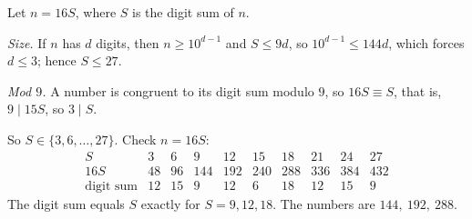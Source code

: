 Let $n=16S$, where $S$ is the digit sum of $n$.

\emph{Size.} If $n$ has $d$ digits, then $n\ge10^{d-1}$ and $S\le9d$, so $10^{d-1}\le144d$, which forces $d\le3$; hence $S\le27$.

\emph{Mod $9$.} A number is congruent to its digit sum modulo $9$, so $16S\equiv S$, that is, $9\mid15S$, so $3\mid S$.

So $S\in\{3,6,\dots,27\}$. Check $n=16S$:
\[
\begin{array}{c|ccccccccc}
S&3&6&9&12&15&18&21&24&27\\ \hline
16S&48&96&144&192&240&288&336&384&432\\
\text{digit sum}&12&15&9&12&6&18&12&15&9
\end{array}
\]
The digit sum equals $S$ exactly for $S=9,12,18$. The numbers are $\boxed{144,\ 192,\ 288}$.
